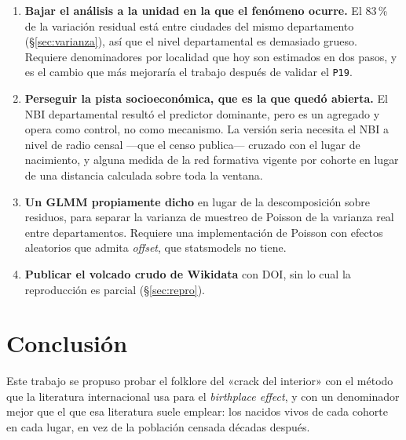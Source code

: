 \documentclass[11pt,a4paper]{article}
\begin{document}
\begin{enumerate}[leftmargin=1.6em,itemsep=0.25em]
    Y no hay ninguna fuente argentina estructurada que pueda tomar su lugar por vía
    automática. Se revisó una por una: \textbf{BDFA} bloquea en su
    \texttt{robots.txt} los agentes automatizados y los \emph{endpoints} de consulta
    de jugadores; \textbf{Transfermarkt} permite las rutas de ficha en su
    \texttt{robots.txt} pero sus términos de uso (§11) prohíben expresamente el
    acceso mediante «bots, spiders, screen scraping u otros procesos
    automatizados»; y el sitio de la \textbf{AFA} sí admite el rastreo —su
    \texttt{robots.txt} solo excluye \texttt{/cache/}— pero no publica fichas con
    lugar de nacimiento. Por eso la verificación es necesariamente manual, y por
    eso este hueco sigue abierto en la literatura.
  \item \textbf{Bajar el análisis a la unidad en la que el fenómeno ocurre.} El
    83\,\% de la variación residual está entre ciudades del mismo departamento
    (§\ref{sec:varianza}), así que el nivel departamental es demasiado grueso.
    Requiere denominadores por localidad que hoy son estimados en dos pasos, y
    es el cambio que más mejoraría el trabajo después de validar el
    \texttt{P19}.
  \item \textbf{Perseguir la pista socioeconómica, que es la que quedó abierta.}
    El NBI departamental resultó el predictor dominante, pero es un agregado y
    opera como control, no como mecanismo. La versión seria necesita el NBI a
    nivel de radio censal —que el censo publica— cruzado con el lugar de
    nacimiento, y alguna medida de la red formativa vigente por cohorte en lugar
    de una distancia calculada sobre toda la ventana.
  \item \textbf{Un GLMM propiamente dicho} en lugar de la descomposición sobre
    residuos, para separar la varianza de muestreo de Poisson de la varianza real
    entre departamentos. Requiere una implementación de Poisson con efectos
    aleatorios que admita \emph{offset}, que statsmodels no tiene.
  \item \textbf{Publicar el volcado crudo de Wikidata} con DOI, sin lo cual la
    reproducción es parcial (§\ref{sec:repro}).
\end{enumerate}

\section{Conclusión}

Este trabajo se propuso probar el folklore del «crack del interior» con el método
que la literatura internacional usa para el \emph{birthplace effect}, y con un
denominador mejor que el que esa literatura suele emplear: los nacidos vivos de
cada cohorte en cada lugar, en vez de la población censada décadas después.
\end{document}
